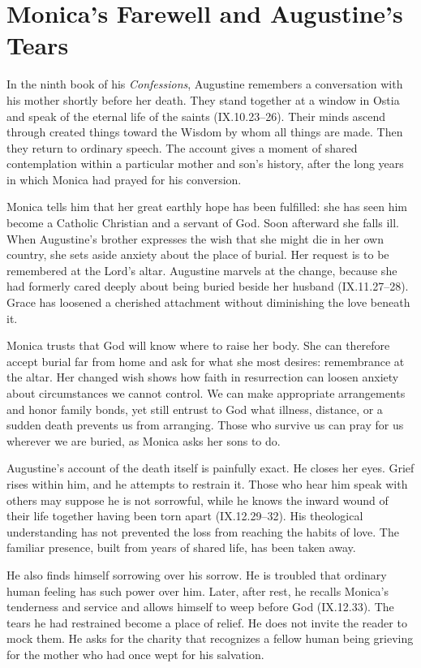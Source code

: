 \section{Monica's Farewell and Augustine's Tears}

In the ninth book of his \emph{Confessions}, Augustine remembers a conversation with his mother shortly before her death. They stand together at a window in Ostia and speak of the eternal life of the saints (IX.10.23--26). Their minds ascend through created things toward the Wisdom by whom all things are made. Then they return to ordinary speech. The account gives a moment of shared contemplation within a particular mother and son's history, after the long years in which Monica had prayed for his conversion.

Monica tells him that her great earthly hope has been fulfilled: she has seen him become a Catholic Christian and a servant of God. Soon afterward she falls ill. When Augustine's brother expresses the wish that she might die in her own country, she sets aside anxiety about the place of burial. Her request is to be remembered at the Lord's altar. Augustine marvels at the change, because she had formerly cared deeply about being buried beside her husband (IX.11.27--28). Grace has loosened a cherished attachment without diminishing the love beneath it.

Monica trusts that God will know where to raise her body. She can therefore accept burial far from home and ask for what she most desires: remembrance at the altar. Her changed wish shows how faith in resurrection can loosen anxiety about circumstances we cannot control. We can make appropriate arrangements and honor family bonds, yet still entrust to God what illness, distance, or a sudden death prevents us from arranging. Those who survive us can pray for us wherever we are buried, as Monica asks her sons to do.

Augustine's account of the death itself is painfully exact. He closes her eyes. Grief rises within him, and he attempts to restrain it. Those who hear him speak with others may suppose he is not sorrowful, while he knows the inward wound of their life together having been torn apart (IX.12.29--32). His theological understanding has not prevented the loss from reaching the habits of love. The familiar presence, built from years of shared life, has been taken away.

He also finds himself sorrowing over his sorrow. He is troubled that ordinary human feeling has such power over him. Later, after rest, he recalls Monica's tenderness and service and allows himself to weep before God (IX.12.33). The tears he had restrained become a place of relief. He does not invite the reader to mock them. He asks for the charity that recognizes a fellow human being grieving for the mother who had once wept for his salvation.

